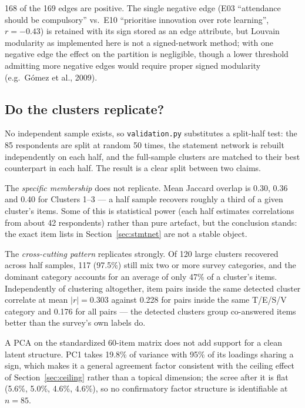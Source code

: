 \documentclass[11pt,a4paper]{article}
\begin{document}
168 of the 169 edges are positive. The single negative edge (E03 ``attendance should be compulsory'' vs.\ E10 ``prioritise innovation over rote learning'', $r = -0.43$) is retained with its sign stored as an edge attribute, but Louvain modularity as implemented here is not a signed-network method; with one negative edge the effect on the partition is negligible, though a lower threshold admitting more negative edges would require proper signed modularity (e.g.\ G\'omez et al., 2009).

\subsection{Do the clusters replicate?}\label{sec:replication}
No independent sample exists, so \texttt{validation.py} substitutes a split-half test: the 85 respondents are split at random 50 times, the statement network is rebuilt independently on each half, and the full-sample clusters are matched to their best counterpart in each half. The result is a clear split between two claims.

The \emph{specific membership} does not replicate. Mean Jaccard overlap is 0.30, 0.36 and 0.40 for Clusters 1--3 --- a half sample recovers roughly a third of a given cluster's items. Some of this is statistical power (each half estimates correlations from about 42 respondents) rather than pure artefact, but the conclusion stands: the exact item lists in Section~\ref{sec:stmtnet} are not a stable object.

The \emph{cross-cutting pattern} replicates strongly. Of 120 large clusters recovered across half samples, 117 (97.5\%) still mix two or more survey categories, and the dominant category accounts for an average of only 47\% of a cluster's items. Independently of clustering altogether, item pairs inside the same detected cluster correlate at mean $|r| = 0.303$ against 0.228 for pairs inside the same T/E/S/V category and 0.176 for all pairs --- the detected clusters group co-answered items better than the survey's own labels do.

A PCA on the standardized 60-item matrix does not add support for a clean latent structure. PC1 takes 19.8\% of variance with 95\% of its loadings sharing a sign, which makes it a general agreement factor consistent with the ceiling effect of Section~\ref{sec:ceiling} rather than a topical dimension; the scree after it is flat (5.6\%, 5.0\%, 4.6\%, 4.6\%), so no confirmatory factor structure is identifiable at $n = 85$.
\end{document}
